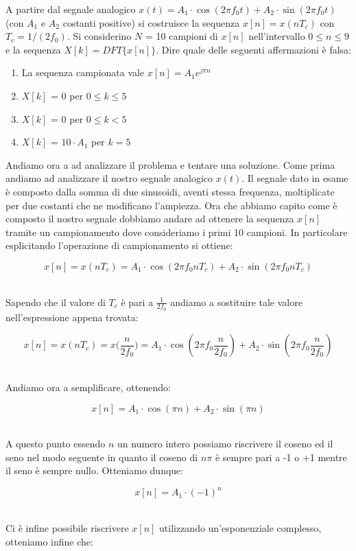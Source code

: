 \documentclass[../main.tex]{subfiles}
\begin{document}
A partire dal segnale analogico $x(t) = A_1 \cdot \cos(2\pi f_0 t) + A_2 \cdot \sin(2\pi f_0 t)$ (con $A_1$ e $A_2$ costanti positive) si costruisce la sequenza $x[n] = x(nT_c)$ con $T_c = 1/(2f_0)$. Si considerino $N$ = 10 campioni di $x[n]$ nell’intervallo $0 \leq n \leq 9$ e la sequenza $X[k] = \unit{DFT}\{x[n]\}$. Dire quale delle seguenti affermazioni è falsa:

\begin{enumerate}
	\item[\textbf{1)}] La sequenza campionata vale $x[n] = A_1e^{j\pi n}$
	\item[\textbf{2)}] $X[k]$ = 0 per $0 \leq k \leq 5$
	\item[\textbf{3)}] $X[k]$ = 0 per $0 \leq k < 5$
	\item[\textbf{4)}] $X[k]$ = $10 \cdot A_1$ per $k = 5$\\
\end{enumerate}

Andiamo ora a ad analizzare il problema e tentare una soluzione.
Come prima andiamo ad analizzare il nostro segnale analogico $x(t)$. Il segnale dato in esame è composto dalla somma di due sinusoidi, aventi stessa frequenza, moltiplicate per due costanti che ne modificano l'ampiezza.
Ora che abbiamo capito come è composto il nostro segnale dobbiamo andare ad ottenere la sequenza $x[n]$ tramite un campionamento dove consideriamo i primi 10 campioni.
In particolare esplicitando l'operazione di campionamento si ottiene:

\[ x[n] = x(nT_c) = A_1 \cdot \cos(2\pi f_0 nT_c) + A_2 \cdot \sin(2\pi f_0 nT_c) \]\

Sapendo che il valore di $T_c$ è pari a $\tfrac{1}{2f_0}$ andiamo a sostituire tale valore nell'espressione appena trovata:

\[ x[n] = x(nT_c) = x\big(\frac{n}{2f_0}\big)  =   A_1 \cdot \cos(2\pi f_0 \frac{n}{2f_0}) + A_2 \cdot \sin(2\pi f_0 \frac{n}{2f_0}) \]\

Andiamo ora a semplificare, ottenendo:

\[ x[n] =  A_1 \cdot \cos(\pi n) + A_2 \cdot \sin(\pi n) \]\

A questo punto essendo $n$ un numero intero possiamo riscrivere il coseno ed il seno nel modo seguente in quanto il coseno di $n\pi$ è sempre pari a -1 o +1 mentre il seno è sempre nullo. Otteniamo dunque:

\[ x[n] = A_1 \cdot (-1)^n\]\

Ci è infine possibile riscrivere $x[n]$ utilizzando un'esponenziale complesso, otteniamo infine che:
\end{document}
